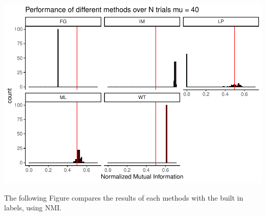 \documentclass[
]{article}
\begin{document}
\includegraphics{com_det_algorithms_files/figure-latex/unnamed-chunk-13-1.pdf}

\newpage

The following Figure compares the results of each methods with the built
in labels, using NMI.
\end{document}
